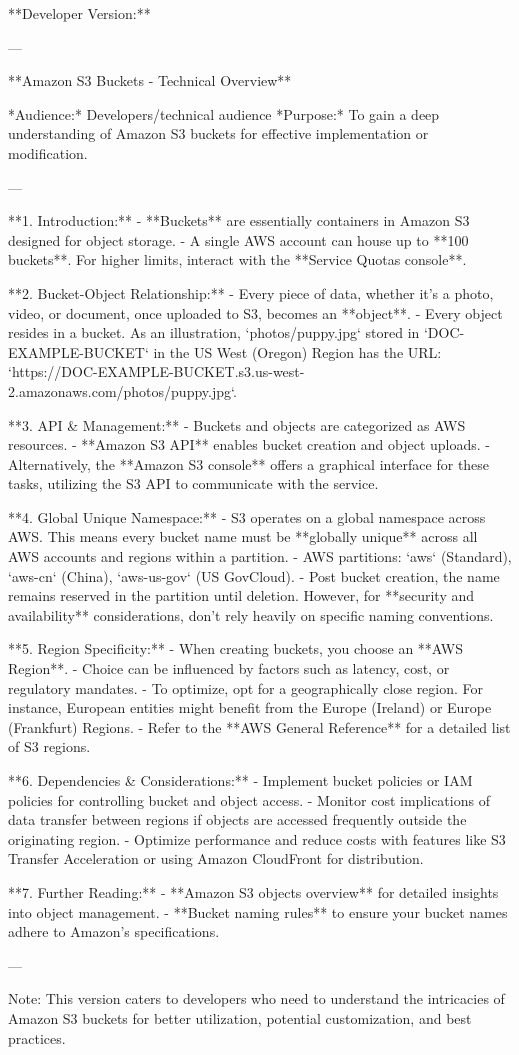 **Developer Version:**

---

**Amazon S3 Buckets - Technical Overview**

*Audience:* Developers/technical audience  
*Purpose:* To gain a deep understanding of Amazon S3 buckets for effective implementation or modification.

---

**1. Introduction:**
- **Buckets** are essentially containers in Amazon S3 designed for object storage.
- A single AWS account can house up to **100 buckets**. For higher limits, interact with the **Service Quotas console**.

**2. Bucket-Object Relationship:**
- Every piece of data, whether it's a photo, video, or document, once uploaded to S3, becomes an **object**.
- Every object resides in a bucket. As an illustration, `photos/puppy.jpg` stored in `DOC-EXAMPLE-BUCKET` in the US West (Oregon) Region has the URL: `https://DOC-EXAMPLE-BUCKET.s3.us-west-2.amazonaws.com/photos/puppy.jpg`.

**3. API & Management:**
- Buckets and objects are categorized as AWS resources.
- **Amazon S3 API** enables bucket creation and object uploads.
- Alternatively, the **Amazon S3 console** offers a graphical interface for these tasks, utilizing the S3 API to communicate with the service.

**4. Global Unique Namespace:**
- S3 operates on a global namespace across AWS. This means every bucket name must be **globally unique** across all AWS accounts and regions within a partition.
- AWS partitions: `aws` (Standard), `aws-cn` (China), `aws-us-gov` (US GovCloud).
- Post bucket creation, the name remains reserved in the partition until deletion. However, for **security and availability** considerations, don't rely heavily on specific naming conventions.

**5. Region Specificity:**
- When creating buckets, you choose an **AWS Region**.
- Choice can be influenced by factors such as latency, cost, or regulatory mandates.
- To optimize, opt for a geographically close region. For instance, European entities might benefit from the Europe (Ireland) or Europe (Frankfurt) Regions.
- Refer to the **AWS General Reference** for a detailed list of S3 regions.

**6. Dependencies & Considerations:**
- Implement bucket policies or IAM policies for controlling bucket and object access.
- Monitor cost implications of data transfer between regions if objects are accessed frequently outside the originating region.
- Optimize performance and reduce costs with features like S3 Transfer Acceleration or using Amazon CloudFront for distribution.

**7. Further Reading:**
- **Amazon S3 objects overview** for detailed insights into object management.
- **Bucket naming rules** to ensure your bucket names adhere to Amazon's specifications.

---

Note: This version caters to developers who need to understand the intricacies of Amazon S3 buckets for better utilization, potential customization, and best practices.